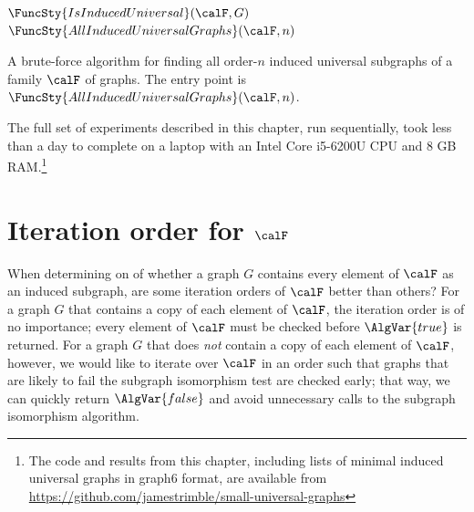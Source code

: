 \begin{algorithm}[h!]
\DontPrintSemicolon
\nl $\FuncSty{IsInducedUniversal}(\calF,G)$ \;
\nl {}
\nl {}
\nl {}
\medskip
\nl $\FuncSty{AllInducedUniversalGraphs}(\calF,n)$ \label{BruteForceFun} \;
\nl {}
\nl {}
\nl {}
\caption{A brute-force algorithm for finding all order-$n$ induced universal subgraphs of a family $\calF$ of graphs.
	The entry point is $\FuncSty{AllInducedUniversalGraphs}(\calF,n)$.}
\label{alg:brute-force}
\end{algorithm}

The full set of experiments described in this chapter, run sequentially,
took less than a day to complete on a laptop with an Intel Core i5-6200U CPU
and 8 GB RAM.\footnote{The code and
results from this chapter, including lists of minimal induced universal graphs
in graph6 format, are available from
\url{https://github.com/jamestrimble/small-universal-graphs}}

\section{Iteration order for $\calF$}\label{sec:iteration-order}

When determining on  of  whether a graph $G$ contains
every element of $\calF$ as an induced subgraph, are some iteration orders of
$\calF$ better than others?  For a graph $G$ that contains a copy of each
element of $\calF$, the iteration order is of no importance;
every element of $\calF$ must be checked before $\AlgVar{true}$ is returned.
For a graph $G$ that
does \emph{not} contain a copy of each element of $\calF$, however, we would like
to iterate over $\calF$ in an order such that graphs that are likely to fail the
subgraph isomorphism test are checked early; that way, we can quickly return
$\AlgVar{false}$ and avoid unnecessary calls to the subgraph isomorphism algorithm.

